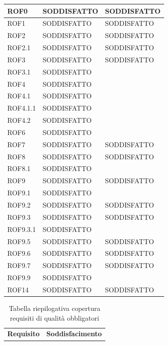 \documentclass[openany,12pt,a4paper]{report}
\begin{document}
\begin{itemize}
\begin{longtable}{|p{40mm}|p{40mm}|p{40mm}|}
		\hline \centering ROF0 & SODDISFATTO & SODDISFATTO \\
		\hline \centering ROF1 & SODDISFATTO & SODDISFATTO\\
		\hline \centering ROF2 & SODDISFATTO & SODDISFATTO\\
		\hline \centering ROF2.1 & SODDISFATTO & SODDISFATTO\\
		\hline \centering ROF3 & SODDISFATTO & SODDISFATTO\\
		\hline \centering ROF3.1 & SODDISFATTO & \\
		\hline \centering ROF4 & SODDISFATTO &\\
		\hline \centering ROF4.1 & SODDISFATTO &\\
		\hline \centering ROF4.1.1 & SODDISFATTO &\\
		\hline \centering ROF4.2 & SODDISFATTO &\\
		\hline \centering ROF6 & SODDISFATTO &\\
		\hline \centering ROF7 & SODDISFATTO & SODDISFATTO\\
		\hline \centering ROF8 & SODDISFATTO & SODDISFATTO\\
		\hline \centering ROF8.1 & SODDISFATTO & \\
		\hline \centering ROF9 & SODDISFATTO & SODDISFATTO\\
		\hline \centering ROF9.1 & SODDISFATTO & \\
		\hline \centering ROF9.2 & SODDISFATTO & SODDISFATTO\\
		\hline \centering ROF9.3 & SODDISFATTO & SODDISFATTO\\
		\hline \centering ROF9.3.1 & SODDISFATTO & \\
		\hline \centering ROF9.5 & SODDISFATTO & SODDISFATTO\\
		\hline \centering ROF9.6 & SODDISFATTO & SODDISFATTO\\
		\hline \centering ROF9.7 & SODDISFATTO & SODDISFATTO\\
		\hline \centering ROF9.9 & SODDISFATTO & \\
		\hline \centering ROF14 & SODDISFATTO & SODDISFATTO\\
		\hline
		
	\end{longtable}

	\begin{longtable}{|p{60mm}|p{60mm}|}
	\caption{Tabella riepilogativa copertura requisiti di qualità obbligatori} \\
	\hline
	\centering \textbf{Requisito} &  \textbf{Soddisfacimento}\\
	

\end{longtable}
\end{itemize}
\end{document}
